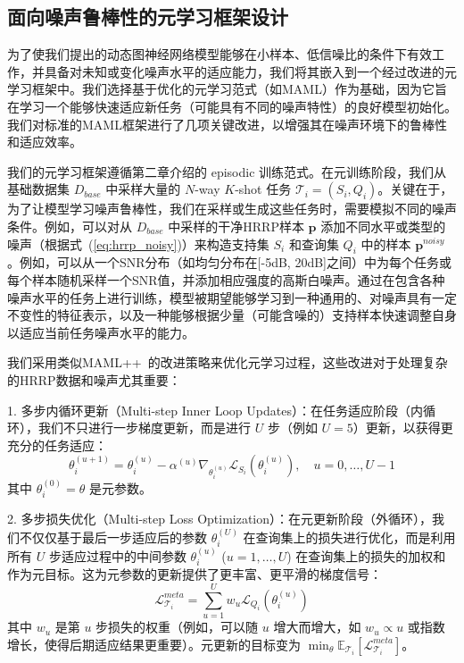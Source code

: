 \subsection{面向噪声鲁棒性的元学习框架设计}
\label{subsec:meta_learning_noise_robust}

为了使我们提出的动态图神经网络模型能够在小样本、低信噪比的条件下有效工作，并具备对未知或变化噪声水平的适应能力，我们将其嵌入到一个经过改进的元学习框架中。我们选择基于优化的元学习范式（如MAML）作为基础，因为它旨在学习一个能够快速适应新任务（可能具有不同的噪声特性）的良好模型初始化。我们对标准的MAML框架进行了几项关键改进，以增强其在噪声环境下的鲁棒性和适应效率。

我们的元学习框架遵循第二章介绍的 episodic 训练范式。在元训练阶段，我们从基础数据集 $D_{base}$ 中采样大量的 $N$-way $K$-shot 任务 $\mathcal{T}_i = (S_i, Q_i)$。关键在于，为了让模型学习噪声鲁棒性，我们在采样或生成这些任务时，需要模拟不同的噪声条件。例如，可以对从 $D_{base}$ 中采样的干净HRRP样本 $\mathbf{p}$ 添加不同水平或类型的噪声（根据式~(\ref{eq:hrrp_noisy})）来构造支持集 $S_i$ 和查询集 $Q_i$ 中的样本 $\mathbf{p}^{noisy}$。例如，可以从一个SNR分布（如均匀分布在[-5dB, 20dB]之间）中为每个任务或每个样本随机采样一个SNR值，并添加相应强度的高斯白噪声。通过在包含各种噪声水平的任务上进行训练，模型被期望能够学习到一种通用的、对噪声具有一定不变性的特征表示，以及一种能够根据少量（可能含噪的）支持样本快速调整自身以适应当前任务噪声水平的能力。

我们采用类似MAML++~\cite{Antoniou2018}的改进策略来优化元学习过程，这些改进对于处理复杂的HRRP数据和噪声尤其重要：

1.  多步内循环更新（Multi-step Inner Loop Updates）：在任务适应阶段（内循环），我们不只进行一步梯度更新，而是进行 $U$ 步（例如 $U=5$）更新，以获得更充分的任务适应：
    \begin{equation}
        \theta_i^{(u+1)} = \theta_i^{(u)} - \alpha^{(u)} \nabla_{\theta_i^{(u)}} \mathcal{L}_{S_i}(\theta_i^{(u)}), \quad u=0, \dots, U-1
        \label{eq:multi_step_inner_update}
    \end{equation}
    其中 $\theta_i^{(0)} = \theta$ 是元参数。

2.  多步损失优化（Multi-step Loss Optimization）：在元更新阶段（外循环），我们不仅仅基于最后一步适应后的参数 $\theta_i^{(U)}$ 在查询集上的损失进行优化，而是利用所有 $U$ 步适应过程中的中间参数 $\theta_i^{(u)}$ ($u=1, \dots, U$) 在查询集上的损失的加权和作为元目标。这为元参数的更新提供了更丰富、更平滑的梯度信号：
    \begin{equation}
        \mathcal{L}_{\mathcal{T}_i}^{meta} = \sum_{u=1}^{U} w_u \mathcal{L}_{Q_i}(\theta_i^{(u)})
        \label{eq:multi_step_loss}
    \end{equation}
    其中 $w_u$ 是第 $u$ 步损失的权重（例如，可以随 $u$ 增大而增大，如 $w_u \propto u$ 或指数增长，使得后期适应结果更重要）。元更新的目标变为 $\min_{\theta} \mathbb{E}_{\mathcal{T}_i} [\mathcal{L}_{\mathcal{T}_i}^{meta}]$。

